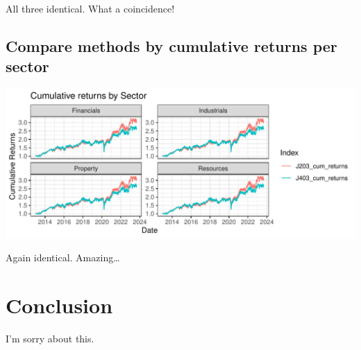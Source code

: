 \documentclass[11pt,preprint, authoryear]{elsarticle}
\numberwithin{equation}{section}
\numberwithin{figure}{section}
\numberwithin{table}{section}
\begin{document}
All three identical. What a coincidence!

\hypertarget{compare-methods-by-cumulative-returns-per-sector}{%
\subsection*{Compare methods by cumulative returns per
sector}\label{compare-methods-by-cumulative-returns-per-sector}}

\includegraphics{Question3_files/figure-latex/unnamed-chunk-4-1.pdf}

Again identical. Amazing\ldots{}

\hypertarget{conclusion}{%
\section*{Conclusion}\label{conclusion}}

I'm sorry about this.


\end{document}
